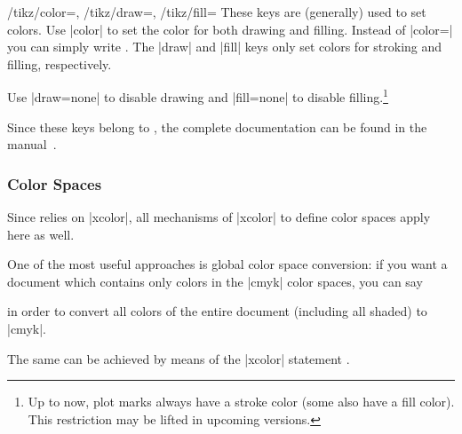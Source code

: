 \begin{keylist}{
    /tikz/color=,
    /tikz/draw=,
    /tikz/fill=%
}
    These keys are (generally) used to set colors. Use |color| to set the color
    for both drawing and filling. Instead of |color=| you can
    simply write . The |draw| and |fill| keys only set colors
    for stroking and filling, respectively.

    Use |draw=none| to disable drawing and |fill=none| to disable
    filling.\footnote{Up to now, plot marks always have a stroke color (some
    also have a fill color). This restriction may be lifted in upcoming
    versions.}

    Since these keys belong to \Tikz{}, the complete documentation can be found
    in the \Tikz{} manual~\cite[Section ``Specifying a Color'']{tikz}.
\end{keylist}


\subsubsection{Color Spaces}

Since \PGFPlots{} relies on |xcolor|, all mechanisms of |xcolor| to define
color spaces apply here as well.

One of the most useful approaches is global color space conversion: if you want
a document which contains only colors in the |cmyk| color spaces, you can say

\begin{codeexample}
\usepackage[cmyk]{xcolor}
\usepackage{pgfplots}
\end{codeexample}
%
\noindent in order to convert all colors of the entire document (including all
shaded) to |cmyk|.

The same can be achieved by means of the |xcolor| statement
\declareandlabel{\selectcolormodel}.
%
\begin{codeexample}
\end{codeexample}


